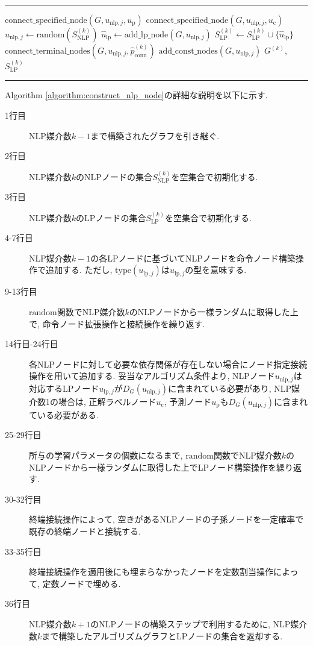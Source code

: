 \documentclass[11pt,oneside,openany,report]{jsbook}
\makeatletter
\newenvironment{breakablealgorithm}
  {%
   \begin{center}
     \refstepcounter{algorithm}%
     \hrule height.8pt depth0pt \kern2pt%
     \renewcommand{\caption}[2][\relax]{%
       {\raggedright\textbf{Algorithm~\thealgorithm} ##2\par}%
       \ifx\relax##1\relax %
         \addcontentsline{loa}{algorithm}{\protect
umberline{\thealgorithm}##2}%
       \else %
         \addcontentsline{loa}{algorithm}{\protect
umberline{\thealgorithm}##1}%
       \fi
       \kern2pt\hrule\kern2pt
     }
  }{%
     \kern2pt\hrule\relax%
   \end{center}
  }
\makeatother
\begin{document}
\begin{breakablealgorithm}
\begin{algorithmic}[1]
    \ENDIF
    \STATE $ \mathrm{connect\_specified\_node}(G,u_{\mathrm{nlp},j}, u_\mathrm{p}) $
    \ENDIF
    \STATE $ \mathrm{connect\_specified\_node}(G,u_{\mathrm{nlp},j}, u_\mathrm{c}) $
    \ENDIF
    \ENDFOR
    \STATE $u_{\mathrm{nlp},j} \leftarrow \mathrm{random}(S_\mathrm{NLP}^{(k)}) $
    \STATE $ \hat{u}_\mathrm{lp} \leftarrow \mathrm{add\_lp\_node}(G,u_{\mathrm{nlp},j}) $
    \STATE $ S_\mathrm{LP}^{(k)} \leftarrow S_\mathrm{LP}^{(k)} \cup \{ \hat{u}_\mathrm{lp} \} $
    \ENDFOR
    \STATE $ \mathrm{connect\_terminal\_nodes}(G,u_{\mathrm{nlp},j}, \hat{p}^{(k)}_\mathrm{conn}) $
    \ENDFOR
    \STATE $ \mathrm{add\_const\_nodes}(G,u_{\mathrm{nlp},j}) $
    \ENDFOR
    \RETURN $G^{(k)}$, $S_\mathrm{LP}^{(k)}$
  \end{algorithmic}
\end{breakablealgorithm}

Algorithm \ref{algorithm:construct_nlp_node}の詳細な説明を以下に示す.

\begin{description}
  \item[1行目] NLP媒介数$k-1$まで構築されたグラフを引き継ぐ.
  \item[2行目] NLP媒介数$k$のNLPノードの集合$S_\mathrm{NLP}^{(k)}$を空集合で初期化する.
  \item[3行目] NLP媒介数$k$のLPノードの集合$S_\mathrm{LP}^{(k)}$を空集合で初期化する.
  \item[4-7行目] NLP媒介数$k-1$の各LPノードに基づいてNLPノードを命令ノード構築操作で追加する. ただし, $\mathrm{type}(u_{\mathrm{lp},j})$は$u_{\mathrm{lp},j}$の型を意味する.
  \item[9-13行目] $\mathrm{random}$関数でNLP媒介数$k$のNLPノードから一様ランダムに取得した上で, 命令ノード拡張操作と接続操作を繰り返す.
  \item[14行目-24行目] 各NLPノードに対して必要な依存関係が存在しない場合にノード指定接続操作を用いて追加する. 妥当なアルゴリズム条件より, NLPノード$u_{\mathrm{nlp},j}$は対応するLPノード$u_{\mathrm{lp},j}$が$D_G(u_{\mathrm{nlp},j})$に含まれている必要があり, NLP媒介数1の場合は, 正解ラベルノード$u_\mathrm{c}$, 予測ノード$u_\mathrm{p}$も$D_G(u_{\mathrm{nlp},j})$に含まれている必要がある.
  \item[25-29行目] 所与の学習パラメータの個数になるまで, $\mathrm{random}$関数でNLP媒介数$k$のNLPノードから一様ランダムに取得した上でLPノード構築操作を繰り返す.
  \item[30-32行目] 終端接続操作によって, 空きがあるNLPノードの子孫ノードを一定確率で既存の終端ノードと接続する.
  \item[33-35行目] 終端接続操作を適用後にも埋まらなかったノードを定数割当操作によって, 定数ノードで埋める.
  \item[36行目] NLP媒介数$k+1$のNLPノードの構築ステップで利用するために, NLP媒介数$k$まで構築したアルゴリズムグラフとLPノードの集合を返却する.
\end{description}
\end{document}
